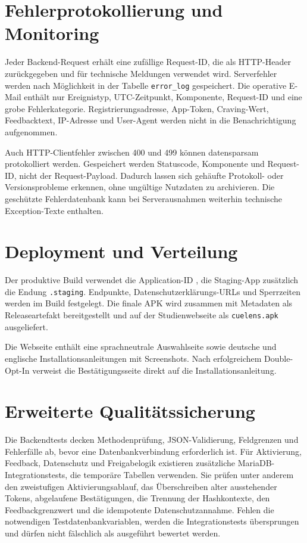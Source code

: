 \section{Fehlerprotokollierung und Monitoring}

Jeder Backend-Request erhält eine zufällige Request-ID, die als HTTP-Header zurückgegeben und für technische Meldungen verwendet wird. Serverfehler werden nach Möglichkeit in der Tabelle \texttt{error\_log} gespeichert. Die operative E-Mail enthält nur Ereignistyp, UTC-Zeitpunkt, Komponente, Request-ID und eine grobe Fehlerkategorie. Registrierungsadresse, App-Token, Craving-Wert, Feedbacktext, IP-Adresse und User-Agent werden nicht in die Benachrichtigung aufgenommen.

Auch HTTP-Clientfehler zwischen 400 und 499 können datensparsam protokolliert werden. Gespeichert werden Statuscode, Komponente und Request-ID, nicht der Request-Payload. Dadurch lassen sich gehäufte Protokoll- oder Versionsprobleme erkennen, ohne ungültige Nutzdaten zu archivieren. Die geschützte Fehlerdatenbank kann bei Serverausnahmen weiterhin technische Exception-Texte enthalten.

\section{Deployment und Verteilung}
Der produktive Build verwendet die Application-ID , die Staging-App zusätzlich die Endung \texttt{.staging}. Endpunkte, Datenschutzerklärungs-URLs und Sperrzeiten werden im Build festgelegt. Die finale APK wird zusammen mit Metadaten als Releaseartefakt bereitgestellt und auf der Studienwebseite als \texttt{cuelens.apk} ausgeliefert.

Die Webseite enthält eine sprachneutrale Auswahlseite sowie deutsche und englische Installationsanleitungen mit Screenshots. Nach erfolgreichem Double-Opt-In verweist die Bestätigungsseite direkt auf die Installationsanleitung.

\section{Erweiterte Qualitätssicherung}
Die Backendtests decken Methodenprüfung, JSON-Validierung, Feldgrenzen und Fehlerfälle ab, bevor eine Datenbankverbindung erforderlich ist. Für Aktivierung, Feedback, Datenschutz und Freigabelogik existieren zusätzliche MariaDB-Integrationstests, die temporäre Tabellen verwenden. Sie prüfen unter anderem den zweistufigen Aktivierungsablauf, das Überschreiben alter ausstehender Tokens, abgelaufene Bestätigungen, die Trennung der Hashkontexte, den Feedbackgrenzwert und die idempotente Datenschutzannahme. Fehlen die notwendigen Testdatenbankvariablen, werden die Integrationstests übersprungen und dürfen nicht fälschlich als ausgeführt bewertet werden.

